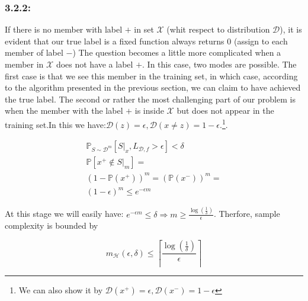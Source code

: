 \documentclass[]{book}
\begin{document}
\subsubsection{3.2.2:}
If there is no member with label $+$ in set $\mathcal{X}$ (whit respect to distribution $\mathcal{D}$), it is evident that our true label is a fixed function always returns $0$ (assign to each member of label $-$)
The question becomes a little more complicated when a member in $\mathcal{X}$ does not have a label $+$. In this case, two modes are possible. The first case is that we see this member in the training set, in which case, according to the algorithm presented in the previous section, we can claim to have achieved the true label. The second or rather the most challenging part of our problem is when the member with the label $+$ is inside  $\mathcal{X}$ but does not appear in the training set.In this we have:$\mathcal{D}(z)=\epsilon ,\mathcal{D}(x \neq z)=1-\epsilon $.\footnote{We can also show it by $\mathcal{D}(x^+)=\epsilon ,\mathcal{D}(x^-)=1-\epsilon $}.


\begin{align*}
    \mathbb{P}_{S \sim \mathcal{D}^m} \left [ S|_x,L_{\mathcal{D},f}>\epsilon \right ]<\delta \\
\mathbb{P}\left [ x^+\notin S|_m \right ]= \\ \left (1-\mathbb{P}(x^+)  \right )^m=\left (\mathbb{P}(x^-)  \right )^m=\\ \left ( 1-\epsilon \right )^m \leq e^{-\epsilon m}
\end{align*}

At this stage we will easily have: $e^{-\epsilon m}\leq \delta \Rightarrow  m\geq \frac{\log\left ( \frac{1}{\delta} \right )}{\epsilon}$. Therfore, sample complexity is
bounded by

\begin{equation*}
    m_{\mathcal{H}}(\epsilon,\delta)\leq \left \lceil \frac{\log \left ( \frac{1}{\delta} \right )}{\epsilon} \right \rceil
\end{equation*}
\end{document}
